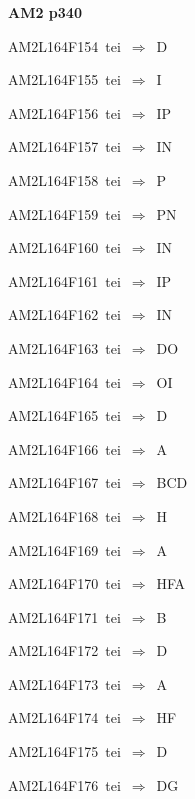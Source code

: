 \par\vfill\eject
{\bf\hfill AM2 p340\hfill\hbox{}}\par\bigskip
{\sixrm AM2L164F154\ {\sixit tei}\ }$\Rightarrow$\ D\par\smallskip
{\sixrm AM2L164F155\ {\sixit tei}\ }$\Rightarrow$\ I\par\smallskip
{\sixrm AM2L164F156\ {\sixit tei}\ }$\Rightarrow$\ IP\par\smallskip
{\sixrm AM2L164F157\ {\sixit tei}\ }$\Rightarrow$\ IN\par\smallskip
{\sixrm AM2L164F158\ {\sixit tei}\ }$\Rightarrow$\ P\par\smallskip
{\sixrm AM2L164F159\ {\sixit tei}\ }$\Rightarrow$\ PN\par\smallskip
{\sixrm AM2L164F160\ {\sixit tei}\ }$\Rightarrow$\ IN\par\smallskip
{\sixrm AM2L164F161\ {\sixit tei}\ }$\Rightarrow$\ IP\par\smallskip
{\sixrm AM2L164F162\ {\sixit tei}\ }$\Rightarrow$\ IN\par\smallskip
{\sixrm AM2L164F163\ {\sixit tei}\ }$\Rightarrow$\ DO\par\smallskip
{\sixrm AM2L164F164\ {\sixit tei}\ }$\Rightarrow$\ OI\par\smallskip
{\sixrm AM2L164F165\ {\sixit tei}\ }$\Rightarrow$\ D\par\smallskip
{\sixrm AM2L164F166\ {\sixit tei}\ }$\Rightarrow$\ A\par\smallskip
{\sixrm AM2L164F167\ {\sixit tei}\ }$\Rightarrow$\ BCD\par\smallskip
{\sixrm AM2L164F168\ {\sixit tei}\ }$\Rightarrow$\ H\par\smallskip
{\sixrm AM2L164F169\ {\sixit tei}\ }$\Rightarrow$\ A\par\smallskip
{\sixrm AM2L164F170\ {\sixit tei}\ }$\Rightarrow$\ HFA\par\smallskip
{\sixrm AM2L164F171\ {\sixit tei}\ }$\Rightarrow$\ B\par\smallskip
{\sixrm AM2L164F172\ {\sixit tei}\ }$\Rightarrow$\ D\par\smallskip
{\sixrm AM2L164F173\ {\sixit tei}\ }$\Rightarrow$\ A\par\smallskip
{\sixrm AM2L164F174\ {\sixit tei}\ }$\Rightarrow$\ HF\par\smallskip
{\sixrm AM2L164F175\ {\sixit tei}\ }$\Rightarrow$\ D\par\smallskip
{\sixrm AM2L164F176\ {\sixit tei}\ }$\Rightarrow$\ DG\par\smallskip
